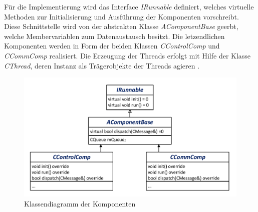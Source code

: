 Für die Implementierung wird das Interface \textit{IRunnable} definiert, welches virtuelle Methoden zur Initialisierung und Ausführung der Komponenten vorschreibt. Diese Schnittstelle wird von der abstrakten Klasse \textit{AComponentBase} geerbt, welche Membervariablen zum Datenaustausch besitzt. Die letzendlichen Komponenten werden in Form der beiden Klassen \textit{CControlComp} und \textit{CCommComp} realisiert. Die Erzeugung der Threads erfolgt mit Hilfe der Klasse \textit{CThread}, deren Instanz als Trägerobjekte der Threads agieren \cite[S. 108 ff.]{Wietzke1}.
\begin{figure}[!h]
\centering
\includegraphics[width=0.6\linewidth]{img/SW_1_KA_KD.pdf}
\caption{Klassendiagramm der Komponenten}
\end{figure}

